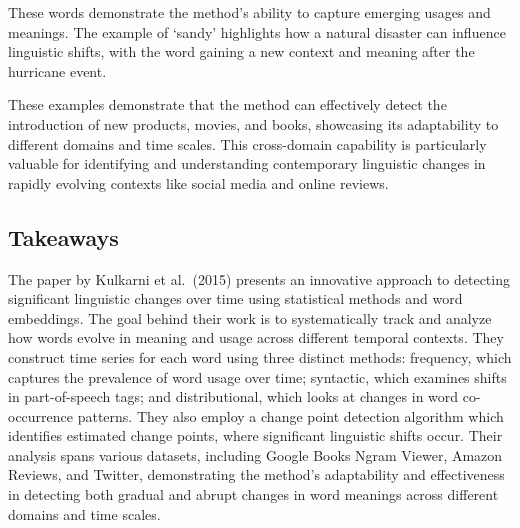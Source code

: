 These words demonstrate the method’s ability to capture emerging usages and meanings.
The example of `sandy' highlights how a natural disaster can influence linguistic shifts, with the word gaining a new context and meaning after the hurricane event.

These examples demonstrate that the method can effectively detect the introduction of new products, movies, and books, showcasing its adaptability to different domains and time scales.
This cross-domain capability is particularly valuable for identifying and understanding contemporary linguistic changes in rapidly evolving contexts like social media and online reviews.

\subsection{Takeaways} \label{subsec:kulkarni-takeaways}
The paper by Kulkarni et al.\ (2015) presents an innovative approach to detecting significant linguistic changes over time using statistical methods and word embeddings.
The goal behind their work is to systematically track and analyze how words evolve in meaning and usage across different temporal contexts.
They construct time series for each word using three distinct methods:
frequency, which captures the prevalence of word usage over time;
syntactic, which examines shifts in part-of-speech tags;
and distributional, which looks at changes in word co-occurrence patterns.
They also employ a change point detection algorithm which identifies estimated change points, where significant linguistic shifts occur.
Their analysis spans various datasets, including Google Books Ngram Viewer, Amazon Reviews, and Twitter,
demonstrating the method’s adaptability and effectiveness in detecting both gradual and abrupt changes in word meanings across different domains and time scales.